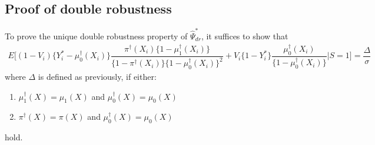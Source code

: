 
\subsection{Proof of double robustness}\label{sec:dr}
To prove the unique double robustness property of $\widehat{\Psi}^*_{dr}$, it suffices to show that 
\begin{align*}
    E\bigg[(1 - V_i)\{Y_i^* - \mu^\dagger_0(X_i)\}\dfrac{\pi^\dagger(X_i)\{1 - \mu^\dagger_1(X_i)\}}{\{1 - \pi^\dagger(X_i)\}\{1 - \mu^\dagger_0(X_i)\}^2} + V_i\{1-Y_i^*\}\dfrac{\mu^\dagger_0(X_i)}{\{1 - \mu^\dagger_0(X_i)\}}\bigg| S=1\bigg] = \dfrac{\Delta}{\sigma}
\end{align*}
where $\Delta$ is defined as previously, if either:
\begin{enumerate}
    \item $\mu_1^\dagger(X) = \mu_1(X)$ and $\mu_0^\dagger(X) = \mu_0(X)$
    \item $\pi^\dagger(X) = \pi(X)$ and $\mu_0^\dagger(X) = \mu_0(X)$
\end{enumerate}
hold.
\vspace{2em}

